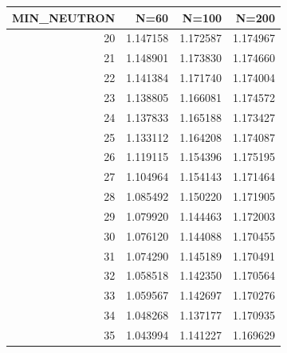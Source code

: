 \begin{tabular}{rrrr}
\toprule
MIN_NEUTRON & N=60 & N=100 & N=200 \\
\midrule
20 & 1.147158 & 1.172587 & 1.174967 \\
21 & 1.148901 & 1.173830 & 1.174660 \\
22 & 1.141384 & 1.171740 & 1.174004 \\
23 & 1.138805 & 1.166081 & 1.174572 \\
24 & 1.137833 & 1.165188 & 1.173427 \\
25 & 1.133112 & 1.164208 & 1.174087 \\
26 & 1.119115 & 1.154396 & 1.175195 \\
27 & 1.104964 & 1.154143 & 1.171464 \\
28 & 1.085492 & 1.150220 & 1.171905 \\
29 & 1.079920 & 1.144463 & 1.172003 \\
30 & 1.076120 & 1.144088 & 1.170455 \\
31 & 1.074290 & 1.145189 & 1.170491 \\
32 & 1.058518 & 1.142350 & 1.170564 \\
33 & 1.059567 & 1.142697 & 1.170276 \\
34 & 1.048268 & 1.137177 & 1.170935 \\
35 & 1.043994 & 1.141227 & 1.169629 \\
\bottomrule
\end{tabular}